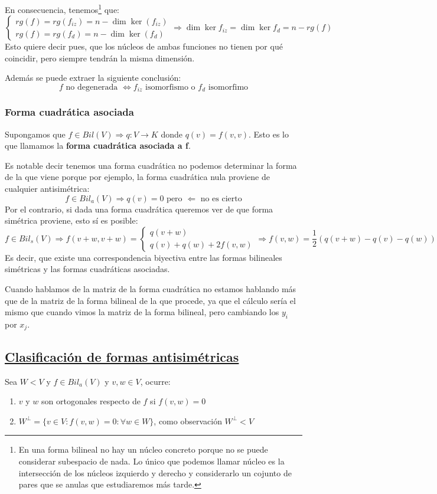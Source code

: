 \documentclass[10pt,a4paper,openright]{book}
\begin{document}
En consecuencia, tenemos\footnote{En una forma bilineal no hay un núcleo concreto porque no se puede considerar subespacio de nada. Lo único que podemos llamar núcleo es la intersección de los núcleos izquierdo y derecho y considerarlo un cojunto de pares que se anulas que estudiaremos más tarde.} que:
$$\begin{cases} rg(f) = rg(f_{iz}) = n - \dim \ker(f_{iz}) \\ rg(f) = rg(f_{d}) = n - \dim \ker(f_{d})  \end{cases}\Rightarrow \dim \ker f_{iz} = \dim \ker f_d = n - rg(f)$$
Esto quiere decir pues, que los núcleos de ambas funciones no tienen por qué coincidir, pero siempre tendrán la misma dimensión.

Además se puede extraer la siguiente conclusión:
$$f \mbox{ no degenerada }\Leftrightarrow f_{iz} \mbox{ isomorfismo o }f_{d} \mbox{ isomorfimo}$$

\subsubsection*{Forma cuadrática asociada}
Supongamos que $f\in Bil(V)\Rightarrow q: V\rightarrow K$ donde $q(v) = f(v,v)$. Esto es lo que llamamos la \textbf{forma cuadrática asociada a f}.

Es notable decir tenemos una forma cuadrática no podemos determinar la forma de la que viene porque por ejemplo, la forma cuadrática nula proviene de cualquier antisimétrica:
$$f\in Bil_a(V) \Rightarrow q(v) = 0 \mbox{ pero }\Leftarrow \mbox{ no es cierto}$$
Por el contrario, si dada una forma cuadrática queremos ver de que forma simétrica proviene, esto sí es posible:
$$f\in Bil_s(V)\Rightarrow f(v+w,v+w)=\begin{cases} q(v+w) \\ q(v)+q(w)+2f(v,w)\end{cases}\Rightarrow f(v,w) = \frac{1}{2}\left( q (v+w) -q(v)-q(w)\right)$$
Es decir, que existe una correspondencia biyectiva entre las formas bilineales simétricas y las formas cuadráticas asociadas.

Cuando hablamos de la matriz de la forma cuadrática no estamos hablando más que de la matriz de la forma bilineal de la que procede, ya que el cálculo sería el mismo que cuando vimos la matriz de la forma bilineal, pero cambiando los $y_i$ por $x_j$.

\subsection*{\underline{Clasificación de formas antisimétricas}}
Sea $W<V$ y $f\in Bil_a(V)$ y $v,w\in V$, ocurre:
\begin{enumerate}
\item $v$ y $w$ son ortogonales respecto de $f$ si $f(v,w)=0$
\item $W^\perp=\{v\in V: f(v,w)=0: \forall w\in W\}$, como observación $W^\perp< V$
\end{enumerate}
\end{document}
